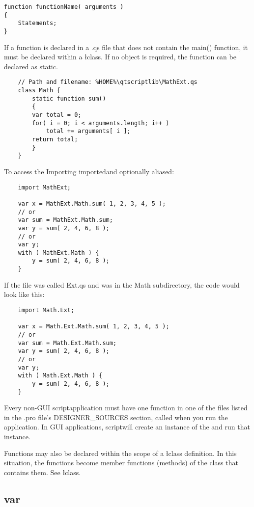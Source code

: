 \documentclass[11pt,a4paper]{book}
\newcommand{\Q}{script}
\newcommand{\QS}{script}
\newcommand{\e}{\sf}
\renewcommand{\c}{\sf}
\begin{document}
{{{{{{\begin{verbatim}
function functionName( arguments )
{
    Statements;
}
\end{verbatim}

    If a function is declared in a \File .qs file that does not contain
    the \File main() function, it must be declared within a \l class. If
    no object is required, the function can be declared as \c static.
    \begin{verbatim}
	// Path and filename: %HOME%\qtscriptlib\MathExt.qs
	class Math {
	    static function sum()
	    {
		var total = 0;
		for( i = 0; i < arguments.length; i++ )
		    total += arguments[ i ];
		return total;
	    }
	}
    \end{verbatim}
    To access the %
    \link Importing imported\endlink and optionally aliased:
    \begin{verbatim}
	import MathExt;

	var x = MathExt.Math.sum( 1, 2, 3, 4, 5 );
    // or
	var sum = MathExt.Math.sum;
	var y = sum( 2, 4, 6, 8 );
    // or
	var y;
	with ( MathExt.Math ) {
	    y = sum( 2, 4, 6, 8 );
	}
    \end{verbatim}
    If the file was called \File Ext.qs and was in the \File Math
    subdirectory, the code would look like this:
    \begin{verbatim}
	import Math.Ext;

	var x = Math.Ext.Math.sum( 1, 2, 3, 4, 5 );
    // or
	var sum = Math.Ext.Math.sum;
	var y = sum( 2, 4, 6, 8 );
    // or
	var y;
	with ( Math.Ext.Math ) {
	    y = sum( 2, 4, 6, 8 );
	}
    \end{verbatim}

    Every non-GUI \Q application must have one function in one of the
    files listed in the \File .pro file's \c DESIGNER_SOURCES section,
    called %
    when you run the application. In GUI applications, \Q will create an
    instance of the \e{main form} and run that instance.

Functions may also be declared within the scope of a \l class
definition. In this situation, the functions become member functions
(methods) of the class that contains them. See \l class.


\subsection{var}

}}}}}}
\end{document}
